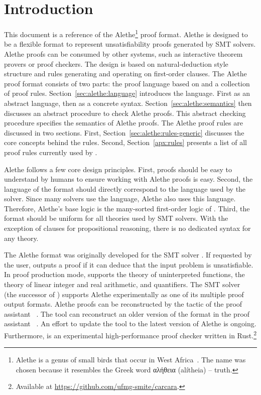 \documentclass{scrartcl}
\begin{document}
\section{Introduction}
This document is a reference of the
Alethe\footnote{Alethe is a genus of small birds that occur in West Africa~\cite{wp:alethe}.
The name was chosen because it
resembles the Greek word {αλήθεια} (alítheia) -- truth.} proof format.  Alethe is
designed to be a flexible format to represent unsatisfiability proofs
generated by SMT solvers.  Alethe proofs can be consumed by other systems,
such as interactive theorem provers or proof checkers.  The design
is based on natural-deduction style structure
and rules generating and operating on first-order clauses.
%
The Alethe proof format consists of two parts: the proof
language based on {\smtlib} and a collection of proof rules.
Section~\ref{sec:alethe:language} introduces the language.  First as an
abstract language, then as a concrete syntax.
Section~\ref{sec:alethe:semantics} then discusses an abstract procedure
to check Alethe proofs.  This abstract checking procedure specifies
the semantics of Alethe proofs.
%
The Alethe proof rules are discussed in two sections.
First, Section~\ref{sec:alethe:rules-generic} discusses the core
concepts behind the rules.
%
Second, Section~\ref{apx:rules} presents a list of
all proof rules currently used by {\verit}.

Alethe follows a few core design principles.  First, proofs should
be easy to understand by humans to ensure working with Alethe proofs
is easy.  Second, the language of the format should directly
correspond to the language used by the solver.  Since many solvers use the
{\smtlib} language, Alethe also uses this language.
Therefore, Alethe's base logic is the many-sorted first-order logic of {\smtlib}.
Third, the format should
be uniform for all theories used by SMT solvers.  With the exception
of clauses for propositional reasoning, there is no dedicated syntax for
any theory.

The Alethe format was originally developed for the SMT solver {\verit}. If requested
by the user, {\verit} outputs a proof if it can deduce that the input problem is
unsatisfiable. In proof production mode, {\verit} supports the theory of
uninterpreted functions, the theory of linear integer and real arithmetic, and
quantifiers.
The SMT solver {\cvcfive}~\cite{barbosa-2022} (the successor of
{\cvcfour}) supports Alethe experimentally as one of its multiple proof
output formats.
%
Alethe proofs can be reconstructed by the  tactic of
the proof assistant {\isabelle}~\cite{fleury-2019,schurr-2021}.
The  tool can
reconstruct an older version of the format in the
proof assistant ~\cite{SMTCoq}.  An effort to update the
tool to the latest version of Alethe is ongoing.
%
Furthermore,  is an experimental
high-performance proof checker written in Rust.\footnote{Available at
\url{https://github.com/ufmg-smite/carcara}.}
\end{document}
